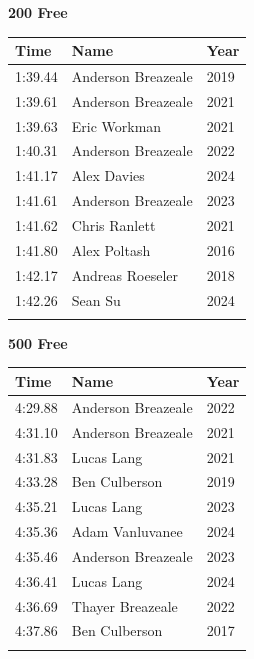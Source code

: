 \vspace{0.5em}
\noindent\begin{minipage}[t]{0.48\textwidth}
\centering
\textbf{\textcolor{teamprimary}{200 Free}}\par
\vspace{0.5em}
\centering
\small
\renewcommand{\arraystretch}{1.0}
\setlength{\tabcolsep}{4pt}
\begin{tabular}{@{}p{1.8cm}p{3.0cm}p{1.0cm}@{}}
\toprule
\textbf{Time} & \textbf{Name} & \textbf{Year} \\
\midrule
1:39.44 & Anderson Breazeale & 2019 \\
1:39.61 & Anderson Breazeale & 2021 \\
1:39.63 & Eric Workman & 2021 \\
1:40.31 & Anderson Breazeale & 2022 \\
1:41.17 & Alex Davies & 2024 \\
1:41.61 & Anderson Breazeale & 2023 \\
1:41.62 & Chris Ranlett & 2021 \\
1:41.80 & Alex Poltash & 2016 \\
1:42.17 & Andreas Roeseler & 2018 \\
1:42.26 & Sean Su & 2024 \\
\bottomrule
\vspace{0.5em}
\end{tabular}
\end{minipage}
\hfill
\begin{minipage}[t]{0.48\textwidth}
\centering
\textbf{\textcolor{teamprimary}{500 Free}}\par
\vspace{0.5em}
\centering
\small
\renewcommand{\arraystretch}{1.0}
\setlength{\tabcolsep}{4pt}
\begin{tabular}{@{}p{1.8cm}p{3.0cm}p{1.0cm}@{}}
\toprule
\textbf{Time} & \textbf{Name} & \textbf{Year} \\
\midrule
4:29.88 & Anderson Breazeale & 2022 \\
4:31.10 & Anderson Breazeale & 2021 \\
4:31.83 & Lucas Lang & 2021 \\
4:33.28 & Ben Culberson & 2019 \\
4:35.21 & Lucas Lang & 2023 \\
4:35.36 & Adam Vanluvanee & 2024 \\
4:35.46 & Anderson Breazeale & 2023 \\
4:36.41 & Lucas Lang & 2024 \\
4:36.69 & Thayer Breazeale & 2022 \\
4:37.86 & Ben Culberson & 2017 \\
\bottomrule
\vspace{0.5em}
\end{tabular}
\end{minipage}
